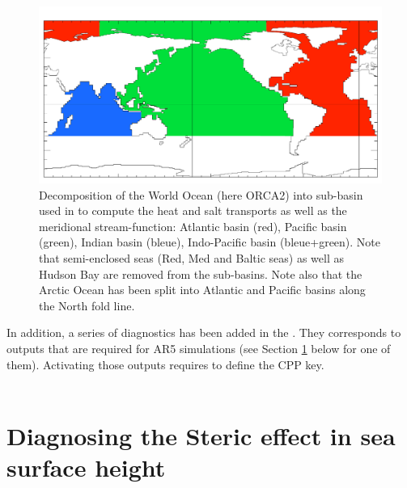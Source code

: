 \begin{figure}[!t] 	  \begin{center}
\includegraphics[width=1.0\textwidth]{./TexFiles/Figures/Fig_mask_subasins.pdf}
\caption{	\label{Fig_mask_subasins}
Decomposition of the World Ocean (here ORCA2) into sub-basin used in to compute
the heat and salt transports as well as the meridional stream-function: Atlantic basin (red), 
Pacific basin (green), Indian basin (bleue), Indo-Pacific basin (bleue+green). 
Note that semi-enclosed seas (Red, Med and Baltic seas) as well as Hudson Bay 
are removed from the sub-basins. Note also that the Arctic Ocean has been split 
into Atlantic and Pacific basins along the North fold line.  }
\end{center}   \end{figure}  

In addition, a series of diagnostics has been added in the . 
They corresponds to outputs that are required for AR5 simulations 
(see Section \ref{DIA_steric} below for one of them). 
Activating those outputs requires to define the  CPP key.
\\
\\



\section{Diagnosing the Steric effect in sea surface height}
\label{DIA_steric}


